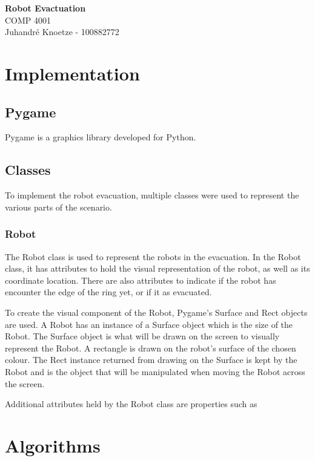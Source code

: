 \documentclass[12pt,letterpaper]{article}
\begin{document}
    \begin{center}
        {\Large\bf Robot Evactuation} \\
        \vspace{0.25em}
        {\large COMP 4001}\\
        \vspace{0.25em}
        Juhandr\'{e} Knoetze - 100882772 \\
    \end{center}

    \section{Implementation}
    \subsection{Pygame}
        Pygame is a graphics library developed for Python.
    
    \subsection{Classes}
        To implement the robot evacuation, multiple classes were used to represent the various parts of the scenario.
        
    \subsubsection{Robot}
        The Robot class is used to represent the robots in the evacuation. In the Robot class, it has attributes to hold the visual representation of the robot, as well as its coordinate location. There are also attributes to indicate if the robot has encounter the edge of the ring yet, or if it as evacuated.
        
        To create the visual component of the Robot, Pygame's Surface and Rect objects are used. A Robot has an instance of a Surface object which is the size of the Robot. The Surface object is what will be drawn on the screen to visually represent the Robot. A rectangle is drawn on the robot's surface of the chosen colour. The Rect instance returned from drawing on the Surface is kept by the Robot and is the object that will be manipulated when moving the Robot across the screen.
        
        Additional attributes held by the Robot class are properties such as
        
    \section{Algorithms}
\end{document}
